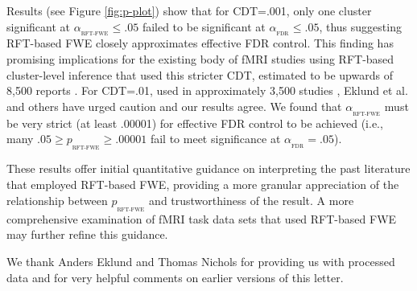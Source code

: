 \documentclass[9pt,twocolumn,twoside]{pnas-new}
\newcommand{\subtext}[2]{
#1_{_{\text{#2}}}
}
\begin{document}
Results (see Figure \ref{fig:p-plot}) show that for CDT=.001, only one cluster significant at $\subtext{\alpha}{RFT-FWE}\leq .05$ failed to be significant at $\subtext{\alpha}{FDR}\leq .05$, thus suggesting RFT-based FWE closely approximates effective FDR control.
This finding has promising implications for the existing body of fMRI studies using RFT-based cluster-level inference that used this stricter CDT, estimated to be upwards of 8,500 reports \cite{nichols_blog,woo14}.
For CDT=.01, used in approximately 3,500 studies \cite{nichols_blog,woo14}, Eklund et al. and others \cite{flandin_analysis_2016} have urged caution and our results agree. We found that $\subtext{\alpha}{RFT-FWE}$ must be very strict (at least .00001) for effective FDR control to be achieved (i.e., many $.05 \geq \subtext{p}{RFT-FWE} \geq .00001$ fail to meet significance at $\subtext{\alpha}{FDR}=.05$).


These results offer initial quantitative guidance on interpreting the past literature that employed RFT-based FWE, providing a more granular appreciation of the relationship between $\subtext{p}{RFT-FWE}$ and trustworthiness of the result.
A more comprehensive examination of fMRI task data sets that used RFT-based FWE may further refine this guidance.

We thank Anders Eklund and Thomas Nichols for providing us with processed data and for very helpful comments on earlier versions of this letter.




  
\end{document}
